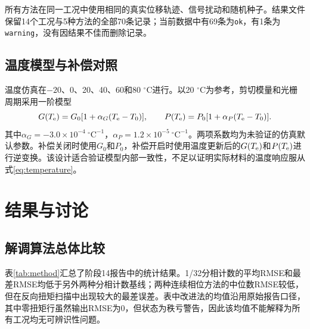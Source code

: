 \documentclass[UTF8,a4paper,12pt]{ctexart}
\newcommand{\bitablecaption}[2]{\caption{#1\\[-0.2em]\small Table \thetable\ #2}}
\begin{document}
所有方法在同一工况中使用相同的真实位移轨迹、信号扰动和随机种子。结果文件保留14个工况与5种方法的全部70条记录；当前数据中有69条为\texttt{ok}，有1条为\texttt{warning}，没有因结果不佳而删除记录。

\subsection{温度模型与补偿对照}

温度仿真在$-20$、0、20、40、60和80 $^\circ$C进行。以20 $^\circ$C为参考，剪切模量和光栅周期采用一阶模型
\begin{equation}
  G(T_{\rm e})=G_0[1+\alpha_G(T_{\rm e}-T_0)],
  \qquad
  P(T_{\rm e})=P_0[1+\alpha_P(T_{\rm e}-T_0)].
  \label{eq:temperature}
\end{equation}
其中$\alpha_G=-3.0\times10^{-4}~^\circ\mathrm{C}^{-1}$，$\alpha_P=1.2\times10^{-5}~^\circ\mathrm{C}^{-1}$。两项系数均为未验证的仿真默认参数。补偿关闭时使用$G_0$和$P_0$，补偿开启时使用温度更新后的$G(T_{\rm e})$和$P(T_{\rm e})$进行逆变换。该设计适合验证模型内部一致性，不足以证明实际材料的温度响应服从式\eqref{eq:temperature}。

\section{结果与讨论}

\subsection{解调算法总体比较}

表\ref{tab:method}汇总了阶段14报告中的统计结果。1/32分相计数的平均RMSE和最差RMSE均低于另外两种分相计数基线；两种连续相位方法的中位数RMSE较低，但在反向扭矩扫描中出现较大的最差误差。表中改进法的均值沿用原始报告口径，其中零扭矩行虽然输出RMSE为0，但状态为秩亏警告，因此该均值不能解释为所有工况均无可辨识性问题。

\begin{table}[htbp]
  \centering
  \bitablecaption{五种方法在14类工况下的统计结果}{Statistics of five methods over the 14 operating cases}
  \label{tab:method}
\end{table}
\end{document}
